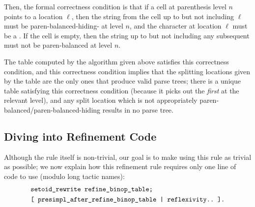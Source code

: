     Then, the formal correctness condition is that if a cell at parenthesis level $n$ points to a location $\ell$, then the string from the cell up to but not including $\ell$ must be paren-balanced-hiding-\terminal{+} at level $n$, and the character at location $\ell$ must be a \terminal{+}.  If the cell is empty, then the string up to but not including any subsequent \terminal{+} must not be paren-balanced at level $n$.
    
    The table computed by the algorithm given above satisfies this correctness condition, and this correctness condition implies that the splitting locations given by the table are the only ones that produce valid parse trees; there is a unique table satisfying this correctness condition (because it picks out the \emph{first} \terminal{+} at the relevant level), and any split location which is not appropriately paren-balanced/paren-balanced-hiding results in no parse tree.  %
  
  \subsection{Diving into Refinement Code}
%    
    
    Although the rule itself is non-trivial, our goal is to make using this rule as trivial as possible; we now explain how this refinement rule requires only one line of code to use (modulo long tactic names):
\begin{align*}
 & \texttt{\texttt{setoid\_rewrite}~\texttt{refine\_binop\_table};} \\
 &\texttt{[~\texttt{presimpl\_after\_refine\_binop\_table}~|~\texttt{reflexivity}..~].}
\end{align*}
    
